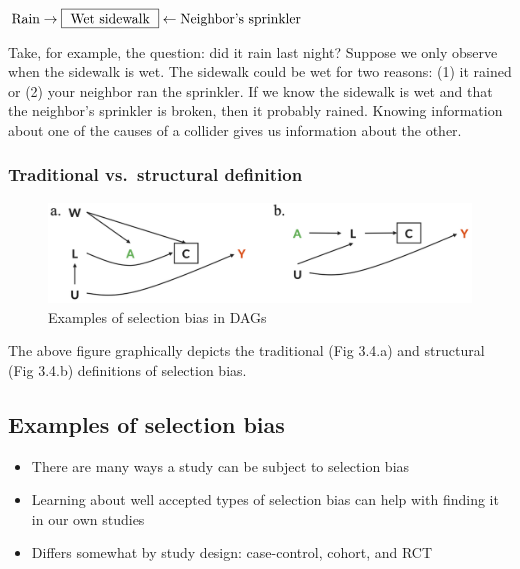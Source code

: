 \documentclass[
]{book}
\providecommand{\tightlist}{%
  \setlength{\itemsep}{0pt}\setlength{\parskip}{0pt}}
\begin{document}
\(\text{Rain} \rightarrow \fbox{ Wet sidewalk } \leftarrow \text{Neighbor's sprinkler}\)

Take, for example, the question: did it rain last night? Suppose we only observe when the sidewalk is wet. The sidewalk could be wet for two reasons: (1) it rained or (2) your neighbor ran the sprinkler. If we know the sidewalk is wet and that the neighbor's sprinkler is broken, then it probably rained. Knowing information about one of the causes of a collider gives us information about the other.

\hypertarget{traditional-vs.-structural-definition}{%
\subsubsection{Traditional vs.~structural definition}\label{traditional-vs.-structural-definition}}

\begin{figure}

{\centering \includegraphics[width=1\linewidth]{img/selection-bias/selection_bias_examples} 

}

\caption{Examples of selection bias in DAGs}\label{fig:unnamed-chunk-15}
\end{figure}

The above figure graphically depicts the traditional (Fig 3.4.a) and structural (Fig 3.4.b) definitions of selection bias.

\hypertarget{examples-of-selection-bias}{%
\subsection{Examples of selection bias}\label{examples-of-selection-bias}}

\begin{itemize}
\tightlist
\item
  There are many ways a study can be subject to selection bias
\item
  Learning about well accepted types of selection bias can help with finding it in our own studies
\item
  Differs somewhat by study design: case-control, cohort, and RCT
\end{itemize}
\end{document}

